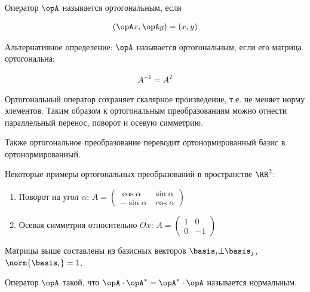 
\begin{definition}
  Оператор \(\opA\) называется ортогональным, если

  \begin{align*}
    (\opA x, \opA y) = (x, y)
  \end{align*}
\end{definition}

\begin{definition}
  Альтернативное определение: \(\opA\) называется ортогональным, если его
  матрица ортогональна:

  \begin{align*}
    A^{-1} = A^{T}
  \end{align*}
\end{definition}

\begin{remark}
  Ортогональный оператор сохраняет скалярное произведение, т.е. не меняет норму
  элементов. Таким образом к ортогональным преобразованиям можно отнести
  параллельный перенос, поворот и осевую симметрию.

  Также ортогональное преобразование переводит ортонормированный базис в
  ортонормированный.
\end{remark}

Некоторые примеры ортогональных преобразований в пространстве \(\RR^3\):
\begin{enumerate}
\item Поворот на угол \(\alpha\): \(A = \begin{pmatrix}
  \cos \alpha & \sin \alpha \\
  -\sin \alpha & \cos \alpha
\end{pmatrix}\)

\item Осевая симметрия относительно \(Ox\): \(A = \begin{pmatrix}
  1 & 0 \\
  0 & -1
\end{pmatrix}\)
\end{enumerate}

Матрицы выше составлены из базисных векторов
\(\basis_{i} \bot \basis_{j}\),
\(\norm{\basis_{i}} = 1\).

\begin{definition}
  Оператор \(\opA\) такой, что \(\opA \cdot \opA^* = \opA^* \cdot \opA\)
  называется нормальным.
\end{definition}


